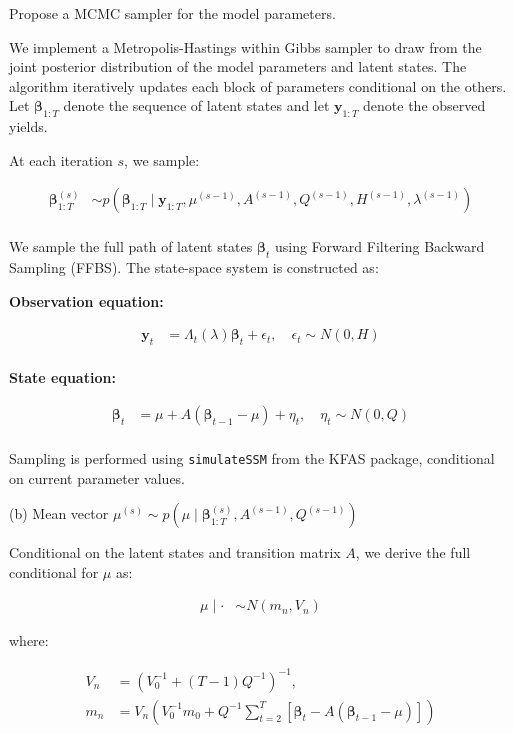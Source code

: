 Propose a MCMC sampler for the model parameters.

We implement a Metropolis-Hastings within Gibbs sampler to draw from the joint posterior distribution of the model parameters and latent states. The algorithm iteratively updates each block of parameters conditional on the others. Let $\mathbf{\beta}_{1:T}$ denote the sequence of latent states and let $\mathbf{y}_{1:T}$ denote the observed yields.

At each iteration $s$, we sample:

\begin{align*}
\mathbf{\beta}_{1:T}^{(s)} &\sim p(\mathbf{\beta}_{1:T} \mid \mathbf{y}_{1:T}, \mu^{(s-1)}, A^{(s-1)}, Q^{(s-1)}, H^{(s-1)}, \lambda^{(s-1)}) \\
\end{align*}

We sample the full path of latent states $\mathbf{\beta}_t$ using Forward Filtering Backward Sampling (FFBS). The state-space system is constructed as:

\textbf{Observation equation:}

\begin{align*}
\mathbf{y}_t &= \Lambda_t(\lambda) \mathbf{\beta}_t + \epsilon_t, \quad \epsilon_t \sim N(0, H) \\
\end{align*}

\textbf{State equation:}

\begin{align*}
\mathbf{\beta}_t &= \mu + A (\mathbf{\beta}_{t-1} - \mu) + \eta_t, \quad \eta_t \sim N(0, Q) \\
\end{align*}

Sampling is performed using \texttt{simulateSSM} from the KFAS package, conditional on current parameter values.

(b) Mean vector $\mu^{(s)} \sim p(\mu \mid \mathbf{\beta}_{1:T}^{(s)}, A^{(s-1)}, Q^{(s-1)})$

Conditional on the latent states and transition matrix $A$, we derive the full conditional for $\mu$ as:

\begin{align*}
\mu \mid \cdot &\sim N(m_n, V_n)
\end{align*}

where:

\begin{align*}
V_n &= \left(V_0^{-1} + (T-1) Q^{-1}\right)^{-1}, \\
m_n &= V_n \left(V_0^{-1} m_0 + Q^{-1} \sum_{t=2}^{T} \left[\mathbf{\beta}_t - A(\mathbf{\beta}_{t-1} - \mu)\right] \right)
\end{align*}

